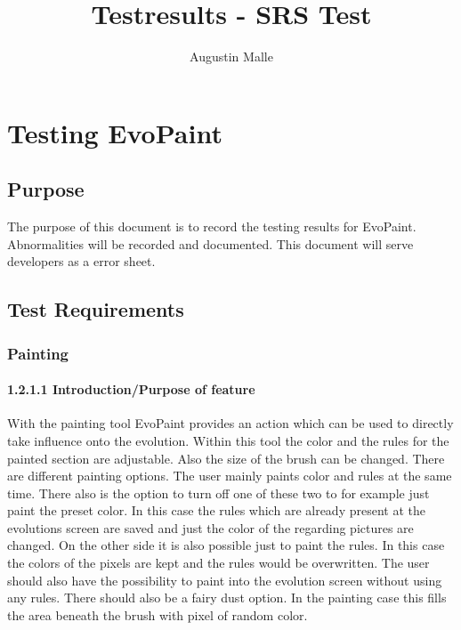 \documentclass[titlepage,12pt]{scrartcl}
\begin{document}
\title{Testresults - SRS Test}
\author{Augustin Malle}

\subject{EvoPaint}

\maketitle

\thispagestyle{empty}
\tableofcontents

\newpage

\section{Testing EvoPaint}

\subsection{Purpose}
The purpose of this document is to record the testing results for EvoPaint. Abnormalities will be recorded and documented. This document will serve developers as a error sheet.

\subsection{Test Requirements}



\subsubsection{Painting}

\paragraph{1.2.1.1 Introduction/Purpose of feature}
With the painting tool EvoPaint provides an action which can be used to directly take influence onto the evolution. Within this tool the color and the rules for the painted section are adjustable. Also the size of the brush can be changed. There are different painting options. The user mainly paints color and rules at the same time. There also is the option to turn off one of these two to for example just paint the preset color. In this case the rules which are already present at the evolutions screen are saved and just the color of the regarding pictures are changed. On the other side it is also possible just to paint the rules. In this case the colors of the pixels are kept and the rules would be overwritten. The user should also have the possibility to paint into the evolution screen without using any rules.
There should also be a fairy dust option. In the painting case this fills the area beneath the brush with pixel of random color.
\end{document}
